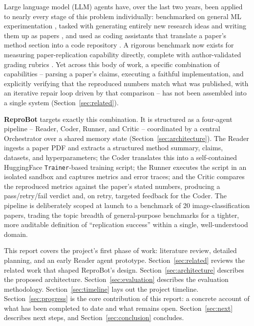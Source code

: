 \documentclass[11pt]{article}
\begin{document}
Large language model (LLM) agents have, over the last two years, been applied to nearly
every stage of this problem individually: benchmarked on general ML experimentation
\cite{huang2023mlagentbench}, tasked with generating entirely new research ideas and
writing them up as papers \cite{lu2024aiscientist,li2024mlrcopilot}, and used as coding
assistants that translate a paper's method section into a code repository
\cite{seo2025papercoder}. A rigorous benchmark now exists for measuring paper-replication
capability directly, complete with author-validated grading rubrics
\cite{starace2025paperbench}. Yet across this body of work, a specific combination of
capabilities -- parsing a paper's claims, executing a faithful implementation, and
explicitly verifying that the reproduced numbers match what was published, with an
iterative repair loop driven by that comparison -- has not been assembled into a single
system (Section~\ref{sec:related}).

\textbf{ReproBot} targets exactly this combination. It is structured as a four-agent
pipeline -- Reader, Coder, Runner, and Critic -- coordinated by a central Orchestrator
over a shared memory state (Section~\ref{sec:architecture}). The Reader ingests a paper
PDF and extracts a structured method summary, claims, datasets, and hyperparameters; the
Coder translates this into a self-contained HuggingFace \texttt{Trainer}-based training
script; the Runner executes the script in an isolated sandbox and captures metrics and
error traces; and the Critic compares the reproduced metrics against the paper's stated
numbers, producing a pass/retry/fail verdict and, on retry, targeted feedback for the
Coder. The pipeline is deliberately scoped at launch to a benchmark of 20
image-classification papers, trading the topic breadth of general-purpose benchmarks for
a tighter, more auditable definition of ``replication success'' within a single,
well-understood domain.

This report covers the project's first phase of work: literature review, detailed
planning, and an early Reader agent prototype. Section~\ref{sec:related} reviews the
related work that shaped ReproBot's design. Section~\ref{sec:architecture} describes the
proposed architecture. Section~\ref{sec:evaluation} describes the evaluation
methodology. Section~\ref{sec:timeline} lays out the project timeline.
Section~\ref{sec:progress} is the core contribution of this report: a concrete account
of what has been completed to date and what remains open. Section~\ref{sec:next}
describes next steps, and Section~\ref{sec:conclusion} concludes.
\end{document}
